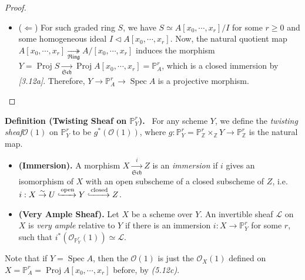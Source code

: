 \documentclass[11pt,a4paper,footinclude=true,headinclude=true]{scrbook} %
\DeclareMathOperator{\Spec}{Spec}
\DeclareMathOperator{\Proj}{Proj}
\newcommand{\LL}{\mathscr{L}}
\newcommand{\OO}{\mathcal{O}}
\newcommand{\PP}{\mathbb{P}}
\newcommand{\Sch}{\mathfrak{Sch}}
\newcommand{\Ring}{\mathfrak{Ring}}
\newcommand{\<}{\langle}
\newcommand{\>}{\rangle}
\newcommand{\isoto}{\overset{\sim}{\to}}
\newenvironment{definition}[2][Definition]
    { \begin{mdframed}[backgroundcolor=gray!20] \textbf{#1 #2.}\ }
    {  \end{mdframed}}
\newenvironment{definition*}[2][Definition]
    { \begin{mdframed}[backgroundcolor=blue!20] \textbf{#1.}\ }
    {  \end{mdframed}}
\newenvironment{remark*}[2][Remark]
    { \begin{mdframed}[backgroundcolor=gray!20] \textbf{#1.}\ }
    {  \end{mdframed}}
\begin{document}
\begin{proof}
\begin{itemize}
        \item ($\Leftarrow$) For such graded ring $S$, we have $S\simeq A[x_0,\cdots,x_r]/I$ for some $r\geq0$ and some homogeneous ideal $I\triangleleft A[x_0,\cdots,x_r]$. Now, the natural quotient map $A[x_0,\cdots,x_r]\underset{\Ring}{\twoheadrightarrow}A/[x_0,\cdots,x_r]$ induces the morphism $Y=\Proj S\xrightarrow[\Sch]{}\Proj A[x_0,\cdots,x_r]=\PP_A^r$, which is a closed immersion by \textit{[3.12a]}. Therefore, $Y\to\PP_A^r\to\Spec A$ is a projective morphism.
    \end{itemize}
\end{proof}

\begin{definition}{(Twisting Sheaf on $\PP_Y^r$)}
    For any scheme $Y$, we define the \textit{twisting sheaf}$\OO(1)$ on $\PP_Y^r$ to be $g^\ast(\OO(1))$, where $g:\PP_Y^r=\PP_\mathbb{Z}^r\times_\mathbb{Z}Y\to\PP_\mathbb{Z}^r$ is the natural map.
\end{definition}

\begin{definition*}\newline
    \begin{itemize}
        \item \textbf{(Immersion).} A morphism $X\xrightarrow[\Sch]{i}Z$ is an \textit{immersion} if $i$ gives an isomorphism of $X$ with an open subscheme of a closed subscheme of $Z$, i.e. $i:X\isoto U\xhookrightarrow{\text{open}}Y\xhookrightarrow{\text{closed}}Z$.
        \item \textbf{(Very Ample Sheaf).} Let $X$ be a scheme over $Y$. An invertible sheaf $\LL$ on $X$ is \textit{very ample} relative to $Y$ if there is an immersion $i:X\to\PP_Y^r$ for some $r$, such that $i^\ast(\OO_{\PP_Y^r}(1))\simeq\LL$.
    \end{itemize}
\end{definition*}
\begin{remark*}{}
    Note that if $Y=\Spec A$, then the $\OO(1)$ is just the $\OO_X(1)$ defined on $X=\PP_A^r=\Proj A[x_0,\cdots,x_r]$ before, by \textit{(5.12c)}.
\end{remark*}
\end{document}
